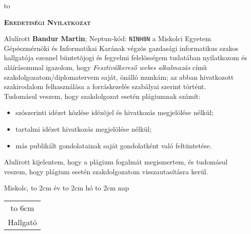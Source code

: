 \hbox to 

\newpage

\vspace*{1cm}  
\begin{center}
\large\textsc{\bfseries Eredetiségi Nyilatkozat}
\end{center}
\vspace*{2cm}  

Alulírott \textbf{Bandur Martin}; Neptun-kód: \texttt{NINH8N} a Miskolci Egyetem Gépészmérnöki és Informatikai Karának végzõs gazdasági informatikus szakos hallgatója ezennel büntetõjogi és fegyelmi felelõsségem tudatában nyilatkozom és aláírásommal igazolom, hogy
\textit{Fesztiválkereső webes alkalmazás}
címû szakdolgozatom/diplomatervem saját, önálló munkám; az abban hivatkozott szakirodalom
felhasználása a forráskezelés szabályai szerint történt.\\

Tudomásul veszem, hogy szakdolgozat esetén plágiumnak számít:
\begin{itemize}
\item szószerinti idézet közlése idézõjel és hivatkozás megjelölése nélkül;
\item tartalmi idézet hivatkozás megjelölése nélkül;
\item más publikált gondolatainak saját gondolatként való feltüntetése.
\end{itemize}

Alulírott kijelentem, hogy a plágium fogalmát megismertem, és tudomásul veszem, hogy
plágium esetén szakdolgozatom visszautasításra kerül.

\vspace*{3cm}

\noindent Miskolc, \hbox to 2cm{\dotfill} év \hbox to 2cm{\dotfill} hó \hbox to 2cm{\dotfill} nap

\vspace*{3cm}

\hspace*{8cm}\begin{tabular}{c}
\hbox to 6cm{\dotfill}\\
Hallgató
\end{tabular}
